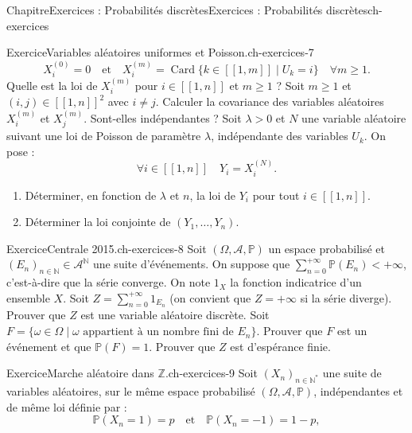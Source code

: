\documentclass[twoside,10pt,]{book}
\numberwithin{equation}{chapter}
\newcommand{\N}{\mathbb N}
\renewcommand{\Pr}{\mathbb P}
\newcommand\card{\operatorname{Card}}
\renewcommand\llbracket{[\![}
\renewcommand\rrbracket{]\!]}
\newcommand{\lt}{<}
\newcommand{\gt}{>}
\begin{document}
\begin{chapterptx}{Chapitre}{Exercices : Probabilités discrètes}{}{Exercices : Probabilités discrètes}{}{}{ch-exercices}
\begin{inlineexercise}{Exercice}{Variables aléatoires uniformes et Poisson.}{ch-exercices-7}
\begin{equation*}
X_{i}^{(0)} = 0 \quad \text{et} \quad X_{i}^{(m)} = \card\{k \in \llbracket 1, m \rrbracket \mid U_{k} = i\} \quad \forall m \geqslant 1.
\end{equation*}
%
Quelle est la loi de \(X_{i}^{(m)}\) pour \(i \in \llbracket 1, n \rrbracket\) et \(m \geqslant 1\) ?%
Soit \(m \geqslant 1\) et \((i, j) \in \llbracket 1, n \rrbracket^{2}\) avec \(i \neq j\). Calculer la covariance des variables aléatoires \(X_{i}^{(m)}\) et \(X_{j}^{(m)}\). Sont-elles indépendantes ?%
Soit \(\lambda\gt0\) et \(N\) une variable aléatoire suivant une loi de Poisson de paramètre \(\lambda\), indépendante des variables \(U_{k}\). On pose :%
\begin{equation*}
\forall i \in \llbracket 1, n \rrbracket \quad Y_{i} = X_{i}^{(N)}.
\end{equation*}
%
%
\begin{enumerate}[label={\arabic*.}]
\item{}Déterminer, en fonction de \(\lambda\) et \(n\), la loi de \(Y_{i}\) pour tout \(i \in \llbracket 1, n \rrbracket\).%
\item{}Déterminer la loi conjointe de \((Y_{1}, \ldots, Y_{n})\).%
\end{enumerate}
\end{inlineexercise}%
\begin{inlineexercise}{Exercice}{Centrale 2015.}{ch-exercices-8}%
Soit \((\Omega, \mathcal{A}, \Pr)\) un espace probabilisé et \((E_{n})_{n \in \N} \in \mathcal{A}^{\N}\) une suite d'événements. On suppose que \(\sum_{n=0}^{+\infty} \Pr(E_{n}) \lt +\infty\), c'est-à-dire que la série converge.%
On note \(1_{X}\) la fonction indicatrice d'un ensemble \(X\). Soit \(Z = \sum_{n=0}^{+\infty} 1_{E_{n}}\) (on convient que \(Z = +\infty\) si la série diverge). Prouver que \(Z\) est une variable aléatoire discrète.%
Soit \(F = \{\omega \in \Omega \mid \omega \text{ appartient à un nombre fini de } E_{n}\}\). Prouver que \(F\) est un événement et que \(\Pr(F) = 1\).%
Prouver que \(Z\) est d'espérance finie.%
\end{inlineexercise}%
\begin{inlineexercise}{Exercice}{Marche aléatoire dans \(\mathbb{Z}\).}{ch-exercices-9}%
Soit \((X_{n})_{n \in \N^{*}}\) une suite de variables aléatoires, sur le même espace probabilisé \((\Omega, \mathcal{A}, \Pr)\), indépendantes et de même loi définie par :%
\begin{equation*}
\Pr(X_{n} = 1) = p \quad \text{et} \quad \Pr(X_{n} = -1) = 1 - p,

\end{equation*}
\end{inlineexercise}
\end{chapterptx}
\end{document}
